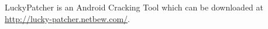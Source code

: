 LuckyPatcher is an Android Cracking Tool which can be downloaded at \url{http://lucky-patcher.netbew.com/}.
